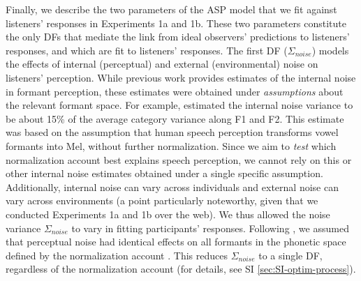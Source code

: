 \documentclass[preprint]{JASA}
\begin{document}
Finally, we describe the two parameters of the ASP model that we fit against listeners' responses in Experiments 1a and 1b. These two parameters constitute the only DFs that mediate the link from ideal observers' predictions to listeners' responses, and which are fit to listeners' responses. The first DF (\(\Sigma_{noise}\)) models the effects of internal (perceptual) and external (environmental) noise on listeners' perception. While previous work provides estimates of the internal noise in formant perception, these estimates were obtained under \emph{assumptions} about the relevant formant space. For example, \citet{feldman2009} estimated the internal noise variance to be about 15\% of the average category variance along F1 and F2. This estimate was based on the assumption that human speech perception transforms vowel formants into Mel, without further normalization. Since we aim to \emph{test} which normalization account best explains speech perception, we cannot rely on this or other internal noise estimates obtained under a single specific assumption. Additionally, internal noise can vary across individuals and external noise can vary across environments (a point particularly noteworthy, given that we conducted Experiments 1a and 1b over the web). We thus allowed the noise variance \(\Sigma_{noise}\) to vary in fitting participants' responses. Following \citet{feldman2009}, we assumed that perceptual noise had identical effects on all formants in the phonetic space defined by the normalization account \citep[see also][]{kronrod2016}. This reduces \(\Sigma_{noise}\) to a single DF, regardless of the normalization account (for details, see SI \ref{sec:SI-optim-process}).
\end{document}
